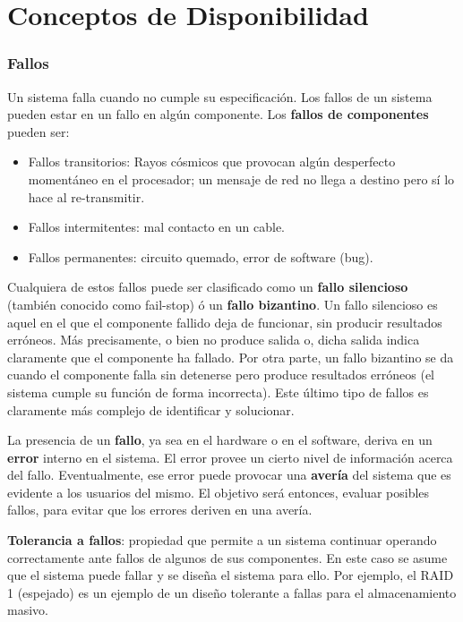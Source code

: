 \section{Conceptos de Disponibilidad}

\subsubsection*{Fallos}  
	Un sistema falla cuando no cumple su especificación. Los fallos de un sistema pueden estar en un fallo en algún componente. Los {\bf fallos de componentes} pueden ser: 
	\begin{itemize}
	\item Fallos transitorios: Rayos cósmicos que provocan algún desperfecto momentáneo en el procesador; un mensaje de red no llega a destino pero sí lo hace al re-transmitir. 
	\item Fallos intermitentes: mal contacto en un cable. 
	\item Fallos permanentes: circuito quemado, error de software (bug).
	\end{itemize}
	
	Cualquiera de estos fallos puede ser clasificado como un {\bf fallo silencioso} (también conocido como fail-stop) ó un {\bf fallo bizantino}. Un fallo silencioso es aquel en el que el componente fallido deja de funcionar, sin producir resultados erróneos. Más precisamente, o bien no produce salida o, dicha salida indica claramente que el componente ha fallado. Por otra parte, un fallo bizantino se da cuando el componente falla sin detenerse pero produce resultados erróneos (el sistema cumple su función de forma incorrecta). Este último tipo de fallos es claramente más complejo de identificar y solucionar. 

La presencia de un {\bf fallo}, ya sea en el hardware o en el software, deriva en un \textbf{error} interno en el sistema. El error provee un cierto nivel de información acerca del fallo. Eventualmente, ese error puede provocar una {\bf avería} del sistema que es evidente a los usuarios del mismo. El objetivo será entonces, evaluar posibles fallos, para evitar que los errores deriven en una avería.

{\bf Tolerancia a fallos}: propiedad que permite a un sistema continuar operando correctamente ante fallos de algunos de sus componentes. En este caso se 
asume que el sistema puede fallar y se diseña el sistema para ello. Por ejemplo, el RAID 1 (espejado) es un ejemplo de un diseño tolerante a fallas para el 
almacenamiento masivo. 



